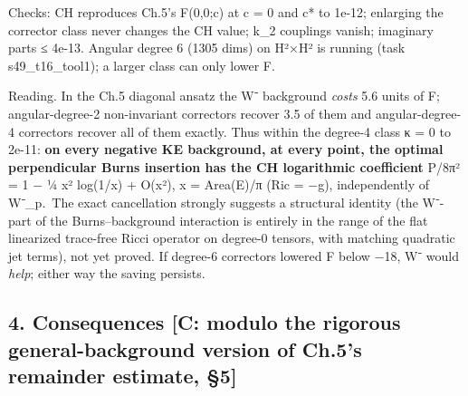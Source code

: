 \documentclass[
  10pt,
]{report}
\begin{document}
Checks: CH reproduces Ch.5's F(0,0;c) at c = 0 and c* to 1e-12;
enlarging the corrector class never changes the CH value; k\_2 couplings
vanish; imaginary parts ≤ 4e-13. Angular degree 6 (1305 dims) on H²×H²
is running (task s49\_t16\_tool1); a larger class can only lower F.

Reading. In the Ch.5 diagonal ansatz the W⁻ background \emph{costs} 5.6
units of F; angular-degree-2 non-invariant correctors recover 3.5 of
them and angular-degree-4 correctors recover all of them exactly. Thus
within the degree-4 class κ = 0 to 2e-11: \textbf{on every negative KE
background, at every point, the optimal perpendicular Burns insertion
has the CH logarithmic coefficient} P/8π² = 1 − ¼ x² log(1/x) + O(x²), x
= Area(E)/π (Ric = −g), independently of W⁻\_p.~The exact cancellation
strongly suggests a structural identity (the W⁻-part of the
Burns--background interaction is entirely in the range of the flat
linearized trace-free Ricci operator on degree-0 tensors, with matching
quadratic jet terms), not yet proved. If degree-6 correctors lowered F
below −18, W⁻ would \emph{help}; either way the saving persists.

\hypertarget{consequences-c-modulo-the-rigorous-general-background-version-of-ch.5s-remainder-estimate-5}{%
\subsection{4. Consequences {[}C: modulo the rigorous general-background
version of Ch.5's remainder estimate,
§5{]}}\label{consequences-c-modulo-the-rigorous-general-background-version-of-ch.5s-remainder-estimate-5}}
\end{document}
